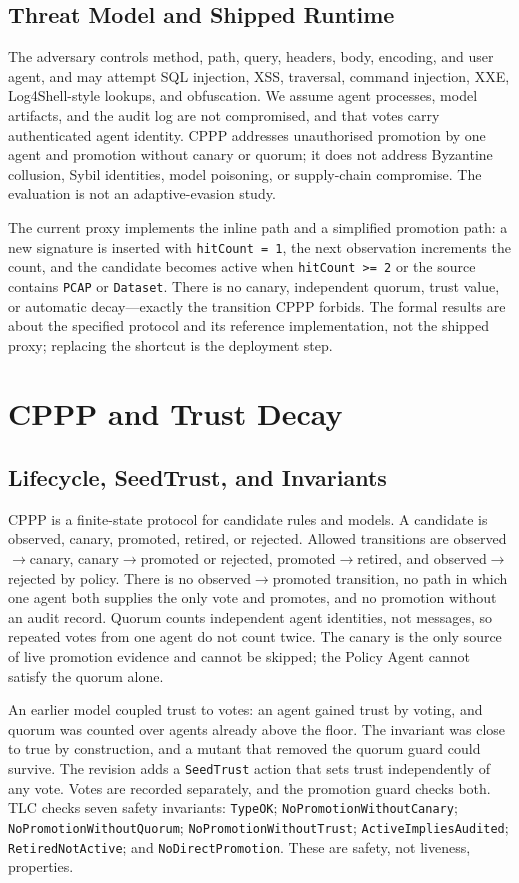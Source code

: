 \documentclass[conference]{IEEEtran}
\newcommand{\feat}[1]{\texttt{#1}}
\begin{document}
\subsection{Threat Model and Shipped Runtime}
The adversary controls method, path, query, headers, body, encoding, and user agent, and may attempt SQL injection, XSS, traversal, command injection, XXE, Log4Shell-style lookups, and obfuscation. We assume agent processes, model artifacts, and the audit log are not compromised, and that votes carry authenticated agent identity. CPPP addresses unauthorised promotion by one agent and promotion without canary or quorum; it does not address Byzantine collusion, Sybil identities, model poisoning, or supply-chain compromise. The evaluation is not an adaptive-evasion study.

The current proxy implements the inline path and a simplified promotion path: a new signature is inserted with \feat{hitCount = 1}, the next observation increments the count, and the candidate becomes active when \feat{hitCount >= 2} or the source contains \feat{PCAP} or \feat{Dataset}. There is no canary, independent quorum, trust value, or automatic decay---exactly the transition CPPP forbids. The formal results are about the specified protocol and its reference implementation, not the shipped proxy; replacing the shortcut is the deployment step.

\section{CPPP and Trust Decay}
\subsection{Lifecycle, SeedTrust, and Invariants}
CPPP is a finite-state protocol for candidate rules and models. A candidate is observed, canary, promoted, retired, or rejected. Allowed transitions are observed$\rightarrow$canary, canary$\rightarrow$promoted or rejected, promoted$\rightarrow$retired, and observed$\rightarrow$rejected by policy. There is no observed$\rightarrow$promoted transition, no path in which one agent both supplies the only vote and promotes, and no promotion without an audit record. Quorum counts independent agent identities, not messages, so repeated votes from one agent do not count twice. The canary is the only source of live promotion evidence and cannot be skipped; the Policy Agent cannot satisfy the quorum alone.

An earlier model coupled trust to votes: an agent gained trust by voting, and quorum was counted over agents already above the floor. The invariant was close to true by construction, and a mutant that removed the quorum guard could survive. The revision adds a \feat{SeedTrust} action that sets trust independently of any vote. Votes are recorded separately, and the promotion guard checks both. TLC checks seven safety invariants: \feat{TypeOK}; \feat{NoPromotionWithoutCanary}; \feat{NoPromotionWithoutQuorum}; \feat{NoPromotionWithoutTrust}; \feat{ActiveImpliesAudited}; \feat{RetiredNotActive}; and \feat{NoDirectPromotion}. These are safety, not liveness, properties.
\end{document}
